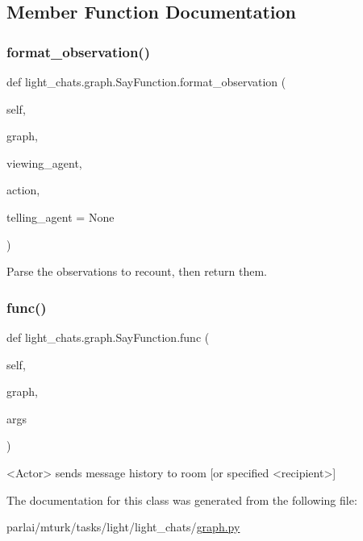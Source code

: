 \subsection{Member Function Documentation}
\mbox{\label{classlight__chats_1_1graph_1_1SayFunction_a20e5908183144f719a93276707938894}} 
\subsubsection{\texorpdfstring{format\+\_\+observation()}{format\_observation()}}
{\footnotesize\ttfamily def light\+\_\+chats.\+graph.\+Say\+Function.\+format\+\_\+observation (\begin{DoxyParamCaption}\item[{}]{self,  }\item[{}]{graph,  }\item[{}]{viewing\+\_\+agent,  }\item[{}]{action,  }\item[{}]{telling\+\_\+agent = {\ttfamily None} }\end{DoxyParamCaption})}

\begin{DoxyVerb}Parse the observations to recount, then return them.
\end{DoxyVerb}
 \mbox{\label{classlight__chats_1_1graph_1_1SayFunction_af14fb1e5a036d9c537ea2915f2c76275}} 
\subsubsection{\texorpdfstring{func()}{func()}}
{\footnotesize\ttfamily def light\+\_\+chats.\+graph.\+Say\+Function.\+func (\begin{DoxyParamCaption}\item[{}]{self,  }\item[{}]{graph,  }\item[{}]{args }\end{DoxyParamCaption})}

\begin{DoxyVerb}<Actor> sends message history to room [or specified <recipient>]
\end{DoxyVerb}
 

The documentation for this class was generated from the following file\+:\begin{DoxyCompactItemize}
\item 
parlai/mturk/tasks/light/light\+\_\+chats/\hyperlink{parlai_2mturk_2tasks_2light_2light__chats_2graph_8py}{graph.\+py}\end{DoxyCompactItemize}
